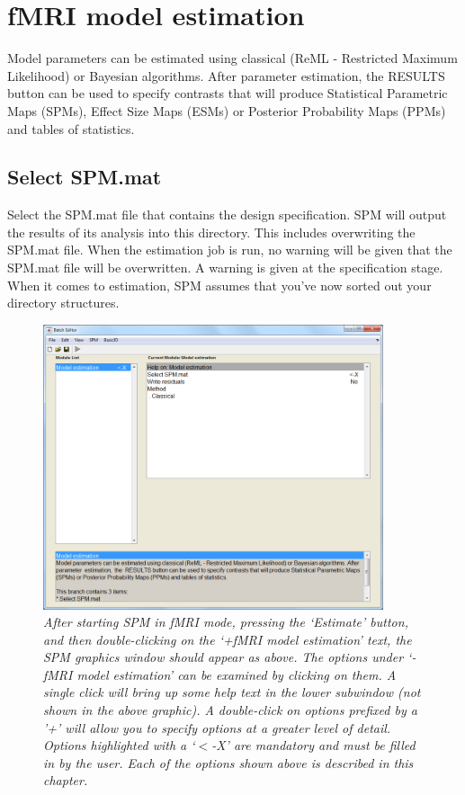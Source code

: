 \chapter{fMRI model estimation \label{Chap:fmri_est}}

Model parameters can be estimated using classical (ReML - Restricted Maximum Likelihood) or Bayesian algorithms. After parameter estimation, the RESULTS button can be used to specify contrasts that will produce Statistical Parametric Maps (SPMs), Effect Size Maps (ESMs) or Posterior Probability Maps (PPMs) and tables of statistics. 

\section{Select SPM.mat}

Select the SPM.mat file that contains the design specification. SPM will output the results of its analysis into this directory. This includes overwriting the SPM.mat file. When the estimation job is run, no warning will be given that the SPM.mat file will be overwritten. A warning is given at the specification stage. When it comes to estimation, SPM assumes that you've now sorted out your directory structures.

\begin{figure}
\begin{center}
\includegraphics[width=100mm]{fmri_est/est_method}
\end{center}
\caption{\em After starting SPM in fMRI mode, pressing the `Estimate' button, and then double-clicking on the `+fMRI model estimation' text, the SPM graphics window should appear as above. The options under `-fMRI model estimation' can be examined by clicking on them. A single click will bring up some help text in the lower subwindow (not shown in the above graphic). A double-click on options prefixed by a '+' will allow you to specify options at a greater level of detail. Options highlighted with a `$<$-X' are mandatory and must be filled in by the user. Each of the options shown above is described in this chapter. \label{est}}
\end{figure}

